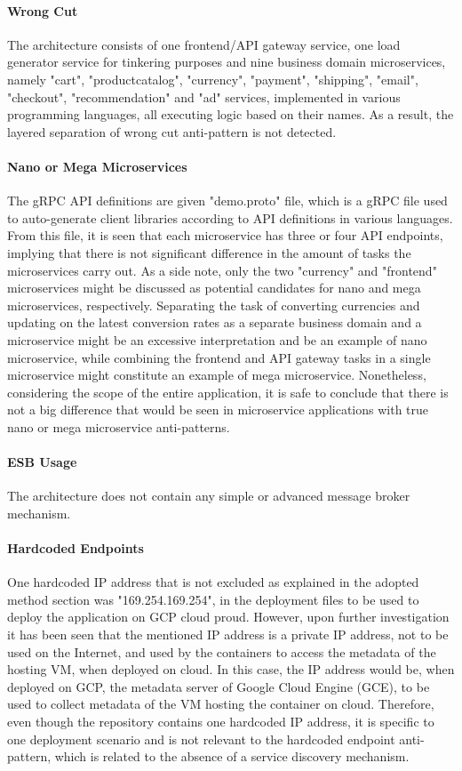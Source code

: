 \documentclass{Configuration_Files/PoliMi3i_thesis}
\begin{document}
\paragraph{Wrong Cut} The architecture consists of one frontend/API gateway service, one load generator service for tinkering purposes and nine business domain microservices, namely "cart", "productcatalog", "currency", "payment", "shipping", "email", "checkout", "recommendation" and "ad" services, implemented in various programming languages, all executing logic based on their names.
As a result, the layered separation of wrong cut anti-pattern is not detected.

\paragraph{Nano or Mega Microservices} The gRPC API definitions are given "demo.proto" file, which is a gRPC file used to auto-generate client libraries according to API definitions in various languages.
From this file, it is seen that each microservice has three or four API endpoints, implying that there is not significant difference in the amount of tasks the microservices carry out.
As a side note, only the two "currency" and "frontend" microservices might be discussed as potential candidates for nano and mega microservices, respectively.
Separating the task of converting currencies and updating on the latest conversion rates as a separate business domain and a microservice might be an excessive interpretation and be an example of nano microservice, while combining the frontend and API gateway tasks in a single microservice might constitute an example of mega microservice.
Nonetheless, considering the scope of the entire application, it is safe to conclude that there is not a big difference that would be seen in microservice applications with true nano or mega microservice anti-patterns.

\paragraph{ESB Usage} The architecture does not contain any simple or advanced message broker mechanism.

\paragraph{Hardcoded Endpoints} One hardcoded IP address that is not excluded as explained in the adopted method section was "169.254.169.254", in the deployment files to be used to deploy the application on GCP cloud proud. 
However, upon further investigation it has been seen that the mentioned IP address is a private IP address, not to be used on the Internet, and used by the containers to access the metadata of the hosting VM, when deployed on cloud.
In this case, the IP address would be, when deployed on GCP, the metadata server of Google Cloud Engine (GCE), to be used to collect metadata of the VM hosting the container on cloud.
Therefore, even though the repository contains one hardcoded IP address, it is specific to one deployment scenario and is not relevant to the hardcoded endpoint anti-pattern, which is related to the absence of a service discovery mechanism.
\end{document}
